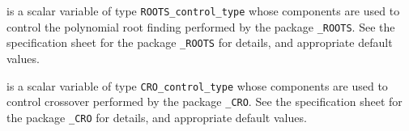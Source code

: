 \begin{description}
 is a scalar variable of type
{\tt ROOTS\_control\_type}
whose components are used to control the polynomial root finding
performed by the package
{\tt \libraryname\_ROOTS}.
See the specification sheet for the package
{\tt \libraryname\_ROOTS}
for details, and appropriate default values.

 is a scalar variable of type
{\tt CRO\_control\_type}
whose components are used to control crossover
performed by the package
{\tt \libraryname\_CRO}.
See the specification sheet for the package
{\tt \libraryname\_CRO}
for details, and appropriate default values.

\end{description}
